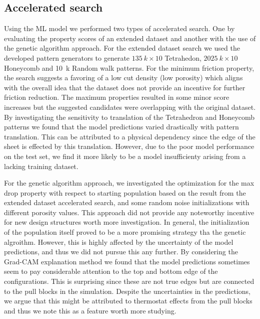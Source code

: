 \subsection{Accelerated search}
Using the \acrshort{ML} model we performed two types of accelerated search. One
by evaluating the property scores of an extended dataset and another with the
use of the genetic algorithm approach. For the extended dataset search we used
the developed pattern generators to generate $\SI{135}{k} \times 10$
Tetrahedon, $\SI{2025}{k} \times 10$ Honeycomb and \SI{10}{k} Random walk
patterns. For the minimum friction property, the search suggests a favoring of a
low cut density (low porosity) which aligns with the overall idea that the
dataset does not provide an incentive for further friction reduction. The
maximum properties resulted in some minor score increases but the suggested
candidates were overlapping with the original dataset. By investigating the
sensitivity to translation of the Tetrahedron and Honeycomb patterns we found that the model predictions varied drastically with pattern translation. This can be attributed to a physical dependency since the edge of the sheet is effected by this
translation. However, due to the poor model performance on the test set, we find it more likely to be a model insufficienty arising from a lacking training dataset. 

For the genetic algorithm approach, we investigated the optimization for the max
drop property with respect to starting population based on the result from the
extended dataset accelerated search, and some random noise initializations with
different porosity values. This approach did not provide any noteworthy
incentive for new design structures worth more investigation. In general, the
initialization of the population itself proved to be a more promising strategy
tha the genetic algroithm. However, this is highly affected by the uncertainty
of the model predictions, and thus we did not pursue this any further. By
considering the Grad-CAM explanation method we found that the model predictions
sometimes seem to pay considerable attention to the top and bottom edge of the
configurations. This is surprising since these are not true edges but are
connected to the pull blocks in the simulation. Despite the uncertainties in the
predictions, we argue that this might be attributed to thermostat effects from
the pull blocks and thus we note this as a feature worth more studying. 



